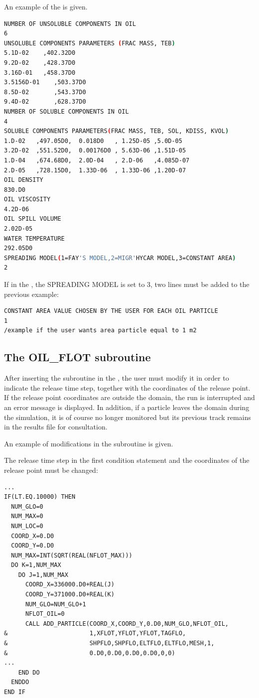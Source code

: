 An example of the  is given.
\begin{lstlisting}[language=bash]
NUMBER OF UNSOLUBLE COMPONENTS IN OIL
6
UNSOLUBLE COMPONENTS PARAMETERS (FRAC MASS, TEB)
5.1D-02    ,402.32D0
9.2D-02    ,428.37D0
3.16D-01   ,458.37D0
3.5156D-01    ,503.37D0
8.5D-02       ,543.37D0
9.4D-02       ,628.37D0
NUMBER OF SOLUBLE COMPONENTS IN OIL
4
SOLUBLE COMPONENTS PARAMETERS(FRAC MASS, TEB, SOL, KDISS, KVOL)
1.D-02   ,497.05D0,  0.018D0   , 1.25D-05 ,5.0D-05
3.2D-02  ,551.52D0,  0.00176D0 , 5.63D-06 ,1.51D-05
1.D-04   ,674.68D0,  2.0D-04   , 2.D-06   ,4.085D-07
2.D-05   ,728.15D0,  1.33D-06  , 1.33D-06 ,1.20D-07
OIL DENSITY
830.D0
OIL VISCOSITY
4.2D-06
OIL SPILL VOLUME
2.02D-05
WATER TEMPERATURE
292.05D0
SPREADING MODEL(1=FAY'S MODEL,2=MIGR'HYCAR MODEL,3=CONSTANT AREA)
2
\end{lstlisting}
If in the , the SPREADING MODEL is set to 3,
two lines must be added to the previous example:
\begin{lstlisting}[language=bash]
CONSTANT AREA VALUE CHOSEN BY THE USER FOR EACH OIL PARTICLE
1
/example if the user wants area particle equal to 1 m2
\end{lstlisting}
\subsection{The OIL\_FLOT subroutine}

After inserting the  subroutine in the ,
the user must modify it in order to indicate the release time step,
together with the coordinates of the release point.
If the release point coordinates are outside the domain, the run is interrupted
and an error message is displayed.
In addition, if a particle leaves the domain during the simulation,
it is of course no longer monitored but its previous track remains
in the results file for consultation.

An example of modifications in the  subroutine is given.

The release time step in the first condition statement and the coordinates
of the release point must be changed:
\begin{lstlisting}[language=TelFortran]
...
IF(LT.EQ.10000) THEN
  NUM_GLO=0
  NUM_MAX=0
  NUM_LOC=0
  COORD_X=0.D0
  COORD_Y=0.D0
  NUM_MAX=INT(SQRT(REAL(NFLOT_MAX)))
  DO K=1,NUM_MAX
    DO J=1,NUM_MAX
      COORD_X=336000.D0+REAL(J)
      COORD_Y=371000.D0+REAL(K)
      NUM_GLO=NUM_GLO+1
      NFLOT_OIL=0
      CALL ADD_PARTICLE(COORD_X,COORD_Y,0.D0,NUM_GLO,NFLOT_OIL,
&                       1,XFLOT,YFLOT,YFLOT,TAGFLO,
&                       SHPFLO,SHPFLO,ELTFLO,ELTFLO,MESH,1,
&                       0.D0,0.D0,0.D0,0.D0,0,0)
...
    END DO
  ENDDO
END IF
\end{lstlisting}

